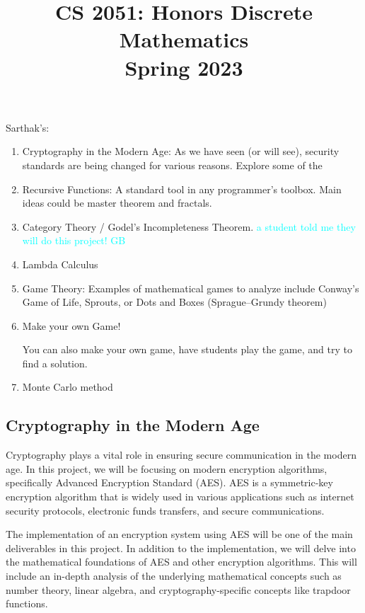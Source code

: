 \documentclass{article}
\title{\vspace{-1cm}CS 2051: Honors Discrete Mathematics \\Spring 2023}
\author{}
\date{}
\begin{document}
\maketitle


Sarthak's:
\begin{enumerate}[label = \arabic*.]
    \item Cryptography in the Modern Age: As we have seen (or will see), security standards are being changed for various reasons. Explore some of the 
    \item Recursive Functions: A standard tool in any programmer's toolbox. Main ideas could be master theorem and fractals.
    \item Category Theory / Godel's Incompleteness Theorem. \textcolor{cyan}{a student told me they will do this project! GB}
    \item Lambda Calculus
    \item Game Theory: Examples of mathematical games to analyze include Conway's Game of Life, Sprouts, or Dots and Boxes (Sprague–Grundy theorem)
    \item Make your own Game!
    
    You can also make your own game, have students play the game, and try to find a solution.
    \item Monte Carlo method
\end{enumerate}

\pagebreak

\subsection*{Cryptography in the Modern Age}
    Cryptography plays a vital role in ensuring secure communication in the modern age. In this project, we will be focusing on modern encryption algorithms, specifically Advanced Encryption Standard (AES). AES is a symmetric-key encryption algorithm that is widely used in various applications such as internet security protocols, electronic funds transfers, and secure communications.
    
    \vspace{3mm}
    The implementation of an encryption system using AES will be one of the main deliverables in this project. In addition to the implementation, we will delve into the mathematical foundations of AES and other encryption algorithms. This will include an in-depth analysis of the underlying mathematical concepts such as number theory, linear algebra, and cryptography-specific concepts like trapdoor functions.
    
\end{document}
